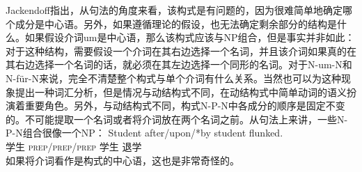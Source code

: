 \begin{exe}
\begin{xlist}[iv.]
\begin{exe}
\begin{xlist}[iv.]
Jackendoff指出，从句法的角度来看，该构式是有问题的，因为很难简单地确定哪个成分是中心语。另外，如果遵循\xbarc 理论的假设，也无法确定剩余部分的结构是什么。如果假设介词um是中心语，那么该构式应该与NP组合，但是事实并非如此：
\eal
{} 
\zl
对于这种结构，需要假设一个介词在其右边选择一个名词，并且该介词如果真的在其右边选择一个名词的话，就必须在其左边选择一个同形的名词。对于N-um-N和N-für-N来说，完全不清楚整个构式与单个介词有什么关系。当然也可以为这种现象提出一种词汇分析，但是情况与动结构式不同，在动结构式中简单动词的语义扮演着重要角色。另外，与动结构式不同，构式N-P-N中各成分的顺序是固定不变的。不可能提取一个名词或者将介词放在两个名词之前。从句法上来讲，一些N-P-N组合很像一个NP\citep[]{Jackendoff2008a}：
\ea
\gll Student after/upon/*by student flunked.\\
	 学生 \textsc{prep}/\textsc{prep}/\textsc{prep} 学生 退学\\
\z
如果将介词看作是构式的中心语，这也是非常奇怪的。


\end{xlist}
\end{exe}
\end{xlist}
\end{exe}
